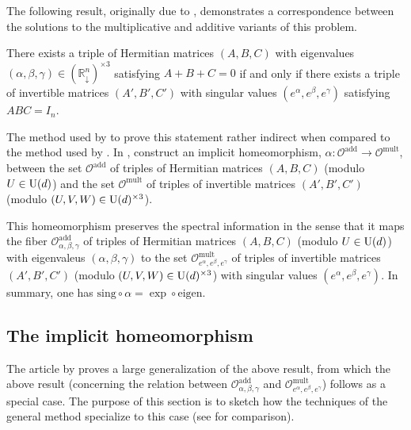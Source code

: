 \documentclass[notitlepage]{article}
\begin{document}
The following result, originally due to \citeauthor{klyachko2000random} \cite{klyachko2000random}, demonstrates a correspondence between the solutions to the multiplicative and additive variants of this problem.
\begin{thm}
    There exists a triple of Hermitian matrices $(A,B,C)$ with eigenvalues $(\alpha, \beta, \gamma) \in (\mathbb R^{n}_{\downarrow})^{\times 3}$ satisfying $A+B+C=0$ if and only if there exists a triple of invertible matrices $(A',B',C')$ with singular values $(e^{\alpha},e^{\beta},e^{\gamma})$ satisfying $ABC=I_n$.
\end{thm}
The method used by \citeauthor{klyachko2000random} \cite{klyachko2000random} to prove this statement rather indirect when compared to the method used by \citeauthor{alekseev2001linearization} \cite{alekseev2001linearization}.
In \cite{alekseev2001linearization}, \citeauthor{alekseev2001linearization} construct an implicit homeomorphism, $\alpha : \mathcal O^{\mathrm{add}} \to \mathcal O^{\mathrm{mult}}$, between the set $\mathcal O^{\mathrm{add}}$ of triples of Hermitian matrices $(A,B,C)$ (modulo $U \in \operatorname{U}(d)$) and the set $\mathcal O^{\mathrm{mult}}$ of triples of invertible matrices $(A',B',C')$ (modulo $(U,V,W) \in \operatorname{U}(d)^{\times 3}$).

This homeomorphism preserves the spectral information in the sense that it maps the fiber $\mathcal O^{\mathrm{add}}_{\alpha,\beta,\gamma}$ of triples of Hermitian matrices $(A,B,C)$ (modulo $U \in \operatorname{U}(d)$) with eigenvaleus $(\alpha, \beta, \gamma)$ to the set $\mathcal O^{\mathrm{mult}}_{e^{\alpha},e^{\beta},e^{\gamma}}$ of triples of invertible matrices $(A',B',C')$ (modulo $(U,V,W) \in \operatorname{U}(d)^{\times 3}$) with singular values $(e^{\alpha},e^{\beta},e^{\gamma})$.
In summary, one has $\mathrm{sing} \circ \alpha = \exp \circ \mathrm{eigen}$.

\subsection{The implicit homeomorphism}

The article by \citeauthor{alekseev2001linearization} \cite{alekseev2001linearization} proves a large generalization of the above result, from which the above result (concerning the relation between $\mathcal O^{\mathrm{add}}_{\alpha,\beta,\gamma}$ and $\mathcal O^{\mathrm{mult}}_{e^{\alpha},e^{\beta},e^{\gamma}}$) follows as a special case.
The purpose of this section is to sketch how the techniques of the general method specialize to this case (see \cite[Section 4]{alekseev2001linearization} for comparison).
\end{document}

